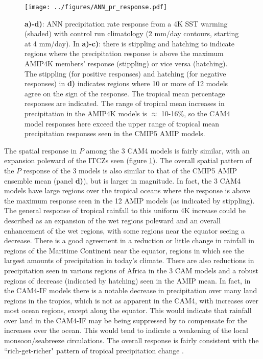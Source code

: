 \documentclass[letterpaper,12pt,titlepage,oneside,final]{book}
\begin{document}
\begin{figure}[H]
\centering
\noindent\texttt{[image: ../figures/ANN\_pr\_response.pdf]}\hfill
\caption{\textbf{a)-d)}: ANN precipitation rate response from a 4K SST warming (shaded) with control run climatology (2 mm/day contours, starting at 4 mm/day). In \textbf{a)-c)}: there is stippling and hatching to indicate regions where the precipitation response is above the maximum AMIP4K members' response (stippling) or vice versa (hatching). The stippling (for positive responses) and hatching (for negative responses) in \textbf{d)} indicates regions where 10 or more of 12 models agree on the sign of the response. The tropical mean percentage responses are indicated. The range of tropical mean increases in precipitation in the AMIP4K models is $\approx$ 10-16\%, so the CAM4 model responses here exceed the upper range of tropical mean precipitation responses seen in the CMIP5 AMIP models.}
\label{fig:presponse}
\end{figure}
The spatial response in $P$ among the 3 CAM4 models is fairly similar, with an expansion poleward of the ITCZs seen (figure \ref{fig:presponse}). The overall spatial pattern of the $P$ response of the 3 models is also similar to that of the CMIP5 AMIP ensemble mean (panel \textbf{d)}), but is larger in magnitude. In fact, the 3 CAM4 models have large regions over the tropical oceans where the response is above the maximum response seen in the 12 AMIP models (as indicated by stippling). The general response of tropical rainfall to this uniform 4K increase could be described as an expansion of the wet regions poleward and an overall enhancement of the wet regions, with some regions near the equator seeing a decrease. There is a good agreement in a reduction or little change in rainfall in regions of the Maritime Continent near the equator, regions in which see the largest amounts of precipitation in today's climate. There are also reductions in precipitation seen in various regions of Africa in the 3 CAM models and a robust regions of decrease (indicated by hatching) seen in the AMIP mean. In fact, in the CAM4-IF models there is a notable decrease in precipitation over many land regions in the tropics, which is not as apparent in the CAM4, with increases over most ocean regions, except along the equator. This would indicate that rainfall over land in the CAM4-IF may be being suppressed by to compensate for the increases over the ocean. This would tend to indicate a weakening of the local monsoon/seabreeze circulations. The overall response is fairly consistent with the ``rich-get-richer" pattern of tropical precipitation change \citep{held_robust_2006,chou_evaluating_2009}.
\end{document}
